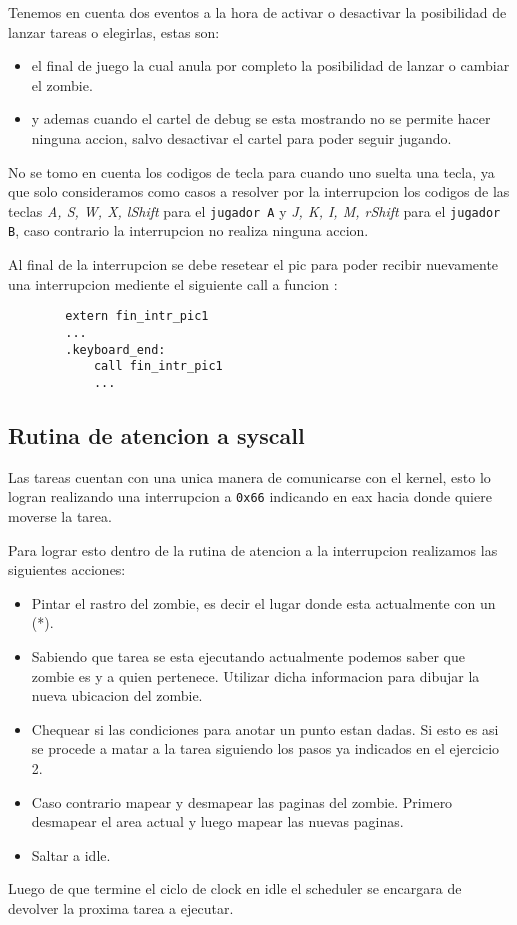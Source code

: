 	Tenemos en cuenta dos eventos a la hora de activar o desactivar la posibilidad de lanzar tareas o elegirlas, estas son: 
	\begin{itemize}
		\item{el final de juego la cual anula por completo la posibilidad de lanzar o cambiar el zombie.}

		\item{y ademas cuando el cartel de debug se esta mostrando no se permite hacer ninguna accion, salvo desactivar el cartel para poder seguir jugando.}
	\end{itemize}

	No se tomo en cuenta los codigos de tecla para cuando uno suelta una tecla, ya que solo consideramos como casos a resolver por la interrupcion los codigos de las teclas \textit{A, S, W, X, lShift} para el \texttt{jugador A} y \textit{J, K, I, M, rShift} para el \texttt{jugador B}, caso contrario la interrupcion no realiza ninguna accion.

	Al final de la interrupcion se debe resetear el pic para poder recibir nuevamente una interrupcion mediente el siguiente call a funcion :

	\begin{lstlisting}
		extern fin_intr_pic1
		...
   		.keyboard_end:
    		call fin_intr_pic1
    		...	
	\end{lstlisting}


	\subsection{Rutina de atencion a syscall}
	Las tareas cuentan con una unica manera de comunicarse con el kernel, esto lo logran realizando una interrupcion a \texttt{0x66} indicando  en eax hacia donde quiere moverse la tarea.

	Para lograr esto dentro de la rutina de atencion a la interrupcion realizamos las siguientes acciones:

	\begin{itemize}
		\item{Pintar el rastro del zombie, es decir el lugar donde esta actualmente con un (*).}
		\item{Sabiendo que tarea se esta ejecutando actualmente podemos saber que zombie es y a quien pertenece. Utilizar dicha informacion para dibujar la nueva ubicacion del zombie.}
		\item{Chequear si las condiciones para anotar un punto estan dadas. Si esto es asi se procede a matar a la tarea siguiendo los pasos ya indicados en el ejercicio 2.}
		\item{Caso contrario mapear y desmapear las paginas del zombie. Primero desmapear el area actual y luego mapear las nuevas paginas.}
		\item{Saltar a idle.}
	\end{itemize}

	Luego de que termine el ciclo de clock en idle el scheduler se encargara de devolver la proxima tarea a ejecutar.